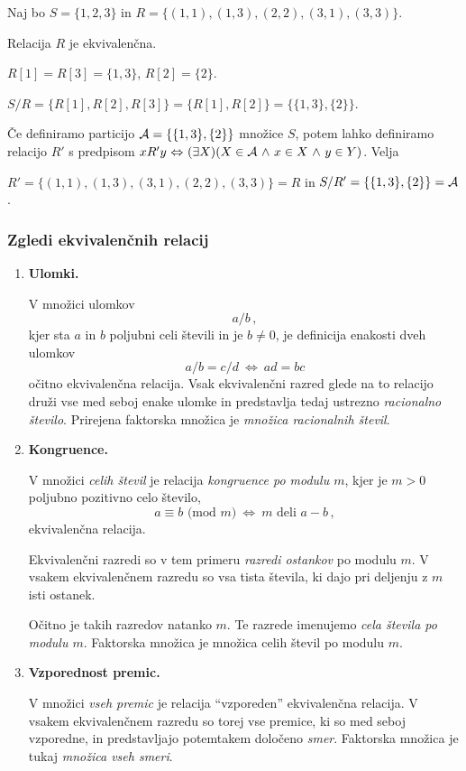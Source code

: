 \documentclass[11pt,paper=b5,DIV=13,headinclude,footinclude]{scrbook}
\newcounter{example}
\def\inn {{~\wedge~}}
\def\cee {{~\Leftrightarrow~}}
\begin{document}
\bigskip
\begin{example*}

Naj bo $S = \{1,2,3\}$ in $R = \{(1,1),(1,3),(2,2),(3,1),(3,3)\}$.

Relacija $R$ je ekvivalenčna.

$R[1] = R[3] = \{1,3\}$, $R[2] = \{2\}$.

$S/R =  \{R[1], R[2],R[3]\} = \{R[1], R[2]\} = \{\{1,3\},\{2\}\}$.

\v Ce definiramo particijo ${\cal A} = \{\{1,3\},\{2\}\}$ množice $S$, potem lahko definiramo relacijo $R'$ s predpisom
$xR'y \cee (\exists X)(X\in {\cal A}\inn x\in X\inn y\in Y)$.
Velja

$R' = \{(1,1),(1,3),(3,1),(2,2),(3,3)\} = R$
in $S/R' = \{\{1,3\},\{2\}\} = {\cal A}$.
\end{example*}


\subsubsection*{Zgledi ekvivalenčnih relacij}

\begin{enumerate}
  \item \textbf{ Ulomki.}

  V množici ulomkov $$a/b\,,$$
  kjer sta $a$ in $b$ poljubni celi števili in je $b\neq 0$, je definicija enakosti dveh ulomkov
  $$a/b = c/d \cee ad = bc$$
  očitno ekvivalenčna relacija. Vsak ekvivalenčni razred glede na to relacijo druži vse med seboj enake ulomke in predstavlja tedaj ustrezno {\em racionalno število}. Prirejena faktorska množica je {\em množica racionalnih števil}.
  \item \textbf{ Kongruence.}


  V množici {\em celih števil} je relacija {\em kongruence po modulu $m$}, kjer je $m> 0$ poljubno pozitivno celo število, $$a\equiv b \textrm{ (mod $m$)}\cee m \textrm{ deli }a-b\,,$$
  ekvivalenčna relacija.

  Ekvivalenčni razredi so v tem primeru {\em razredi ostankov} po modulu $m$. V vsakem ekvivalenčnem razredu so vsa tista števila, ki dajo pri deljenju z $m$ isti ostanek.

  Očitno je takih razredov natanko $m$. Te razrede imenujemo {\em cela števila po modulu $m$}. Faktorska množica je množica celih števil po modulu $m$.

  \item \textbf{ Vzporednost premic.}

V množici {\em vseh premic} je relacija ``vzporeden'' ekvivalenčna relacija. V vsakem ekvivalenčnem razredu so torej vse premice, ki so med seboj vzporedne, in predstavljajo potemtakem določeno {\em smer}. Faktorska množica je tukaj {\em množica vseh smeri}.
\end{enumerate}
\end{document}
